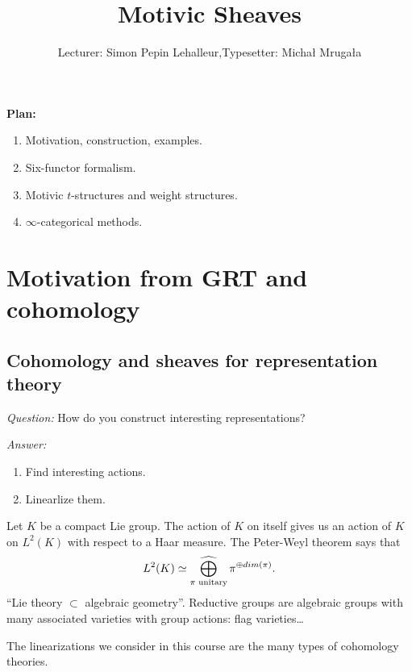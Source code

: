 

\def\Cone{\operatorname{Cone}}
\def\Ch{\cat{Ch}}
\def\ft{^{\text{(f.t)}}}
\def\Sm{\cat{Sm}}
\DeclareMathOperator{\hocolim}{hocolim}
\def\Sing{\operatorname{Sing}}
\def\F{\bb{F}}
\def\Ga{\mathbb{G}_a}
\def\Fr{\operatorname{Fr}}
\def\PSp{\operatorname{PSp}}
\def\Sp{\operatorname{Sp}}
\def\Ev{\operatorname{Ev}}
\def\Sus{\operatorname{Sus}}
\def\Et{\cat{Et}}
\def\Ind{\operatorname{Ind}}
\def\rank{\operatorname{rank}}
\def\Bl{\operatorname{Bl}}

\title{Motivic Sheaves}
\author{Lecturer: Simon Pepin Lehalleur,\quad Typesetter: Micha{\l} Mruga{\l}a}


\maketitle
\textbf{Plan:}
\begin{enumerate}[L1:]
	\item Motivation, construction, examples.
	\item Six-functor formalism.
	\item Motivic $t$-structures and weight structures.
	\item $\infty$-categorical methods.
\end{enumerate}
\section{Motivation from GRT and cohomology}
\subsection{Cohomology and sheaves for representation theory} \leavevmode


\emph{Question:} How do you construct interesting representations?

\emph{Answer:}
\begin{enumerate}[1)]
	\item Find interesting actions.
	\item Linearlize them.
\end{enumerate}

\begin{example}
	Let $K$ be a compact Lie group. The action of $K$ on itself gives us an action of $K$ on $L^2(K)$ with respect to a Haar measure. The Peter-Weyl theorem says that
	\[
	L^2(K) \isoto \cbigoplus_{\pi\text{ unitary}}\pi^{\oplus dim(\pi)}.
	\]
	``Lie theory $\subset $ algebraic geometry''. Reductive groups are algebraic groups with many associated varieties with group actions: flag varieties\dots
\end{example}
The linearizations we consider in this course are the many types of cohomology theories.

